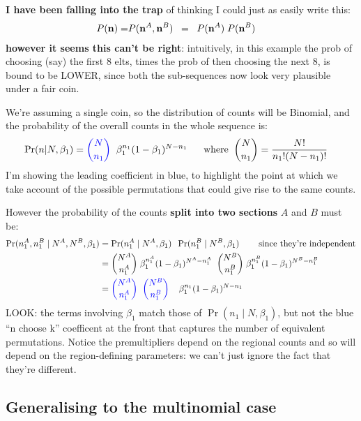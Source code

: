 \documentclass[12pt]{article}
\begin{document}
{\bf I have been falling into the trap} of thinking I could just as easily write this:
\begin{align*}
P(\mathbf{n}) =& P(\mathbf{n}^A , \mathbf{n}^B)
\;\; =\;\; P(\mathbf{n}^A) \; P(\mathbf{n}^B)
\end{align*} {\bf however it seems this can't be right}: intuitively, in this
example the prob of choosing (say) the first 8 elts, times the prob of
then choosing the next 8, is bound to be LOWER, since both the
sub-sequences now look very plausible under a fair coin.

We're assuming a single coin, so the distribution of counts will
be Binomial, and the probability of the overall counts in the whole sequence is:
\begin{align*}
\Pr(n | N,\beta_1) &= {\color{blue}{N \choose n_1}} \;\; \beta_1^{n_1} (1-\beta_1)^{N-n_1}
\;\;\;\;\;\; \text{where} \;\;{N \choose n_1} = \frac{N!}{n_1! (N-n_1)!} 
\end{align*} 
{\color{blue} I'm showing the leading coefficient in blue, to
  highlight the point at which we take account of the possible
  permutations that could give rise to the same counts.}

However the probability of the counts {\bf split into two sections} $A$ and $B$  must be:
\begin{align*}
  \Pr(n_1^A, n_1^B \mid N^A,N^B,\beta_1) 
  &=   \Pr(n_1^A \mid N^A,\beta_1) \;\; \Pr(n_1^B\mid N^B,\beta_1) \;\;\;\;\;\;\;\;\text{since they're independent}\\ 
  &= {N^A \choose n_1^A}
 \; \beta_1^{n_1^A} (1-\beta_1)^{N^A-n_1^A}  \;\; {N^B \choose n_1^B} \;\beta_1^{n_1^B} (1-\beta_1)^{N^B-n_1^B} \\
  &= {\color{blue}{N^A \choose n_1^A} \;\; {N^B \choose n_1^B}} \;\; \;\; \beta_1^{n_1}   (1-\beta_1)^{N-n_1}
\end{align*}
LOOK: the terms involving $\beta_1$ match those of $\Pr(n_1 \mid N,\beta_1)$, but
not the blue ``n choose k'' coefficent at the front that captures the number of
equivalent permutations. Notice the premultipliers depend on the
regional counts and so will depend on the region-defining parameters:
we can't just ignore the fact that they're different.

\subsection{Generalising to the multinomial case}
\end{document}
